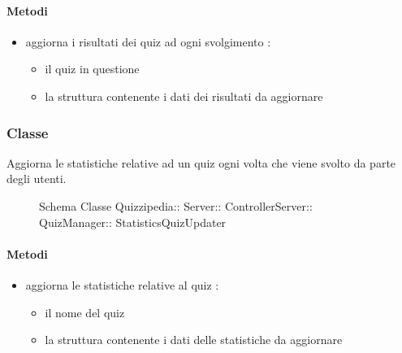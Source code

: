 \paragraph{Metodi}
\begin{itemize}
\item {}
\newline
aggiorna i risultati dei quiz ad ogni svolgimento
\newline
{} :
\begin{itemize}
\item {}
\newline
il quiz in questione
\item {}
\newline
la struttura contenente i dati dei risultati da aggiornare
\end{itemize}
\end{itemize}
\subsubsection{Classe }
Aggiorna le statistiche relative ad un quiz ogni volta che viene svolto da parte degli utenti.
\begin{figure}[H]
\centering
\noindent{}
\caption[Schema Classe StatisticsQuizUpdater]{Schema Classe Quizzipedia:: Server:: ControllerServer:: QuizManager:: StatisticsQuizUpdater}
\end{figure}
\paragraph{Metodi}
\begin{itemize}
\item {}
\newline
aggiorna le statistiche relative al quiz
\newline
{} :
\begin{itemize}
\item {}
\newline
il nome del quiz
\item {}
\newline
la struttura contenente i dati delle statistiche da aggiornare
\end{itemize}
\end{itemize}
